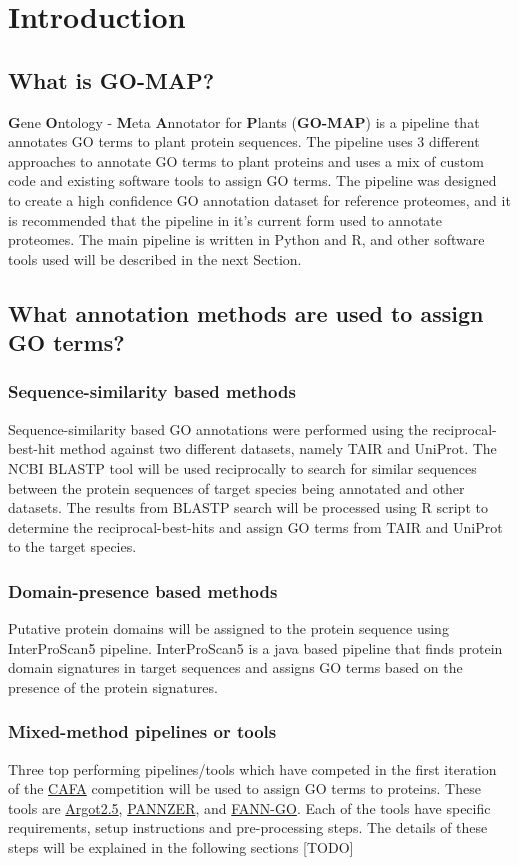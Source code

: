 \section{Introduction}
\label{sec:intro}

\subsection{What is GO-MAP?}
\textbf{G}ene \textbf{O}ntology - \textbf{M}eta \textbf{A}nnotator for \textbf{P}lants (\textbf{GO-MAP}) is a pipeline that annotates GO terms to plant protein sequences. The pipeline uses 3 different approaches to annotate GO terms to plant proteins and uses a mix of custom code and existing software tools to assign GO terms. The pipeline was designed to create a high confidence GO annotation dataset for reference proteomes, and it is recommended that the pipeline in it's current form used to annotate proteomes. The main pipeline is written in Python and R, and other software tools used will be described in the next Section.

\subsection{What annotation methods are used to assign GO terms?}
\subsubsection{Sequence-similarity based methods}
Sequence-similarity based GO annotations were performed using the reciprocal-best-hit method against two different datasets, namely TAIR and UniProt. The NCBI BLASTP tool will be used reciprocally to search for similar sequences between the protein sequences of target species being annotated and other datasets. The results from BLASTP search will be processed using R script to determine the reciprocal-best-hits and assign GO terms from TAIR and UniProt to the target species.

\subsubsection{Domain-presence based methods}
Putative protein domains will be assigned to the protein sequence using InterProScan5 pipeline. InterProScan5 is a java based pipeline that finds protein domain signatures in target sequences and assigns GO terms based on the presence of the protein signatures.

\subsubsection{Mixed-method pipelines or tools}
Three top performing pipelines/tools which have competed in the first iteration of the \href{http://biofunctionprediction.org}{CAFA} competition will be used to assign GO terms to proteins. These tools are \href{http://www.medcomp.medicina.unipd.it/Argot2-5/}{Argot2.5}, \href{http://ekhidna.biocenter.helsinki.fi/pannzer}{PANNZER}, and \href{http://montana.informatics.indiana.edu/fanngo/fanngo.html}{FANN-GO}. Each of the tools have specific requirements, setup instructions and pre-processing steps. The details of these steps will be explained in the following sections [TODO]